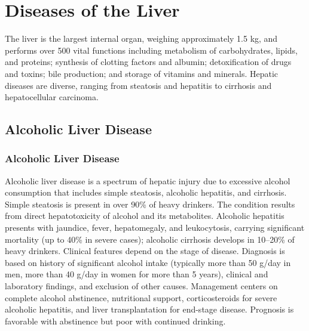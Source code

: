\chapter{Diseases of the Liver}
\label{ch:liver}
The liver is the largest internal organ, weighing approximately 1.5 kg, and performs over 500 vital functions including metabolism of carbohydrates, lipids, and proteins; synthesis of clotting factors and albumin; detoxification of drugs and toxins; bile production; and storage of vitamins and minerals. Hepatic diseases are diverse, ranging from steatosis and hepatitis to cirrhosis and hepatocellular carcinoma.

\section{Alcoholic Liver Disease}








\label{sec:section:Alcoholic Liver Disease}

\subsection{Alcoholic Liver Disease}
\label{sec:Alcoholic Liver Disease}
Alcoholic liver disease is a spectrum of hepatic injury due to excessive alcohol consumption that includes simple steatosis, alcoholic hepatitis, and cirrhosis. Simple steatosis is present in over 90\% of heavy drinkers. The condition results from direct hepatotoxicity of alcohol and its metabolites. Alcoholic hepatitis presents with jaundice, fever, hepatomegaly, and leukocytosis, carrying significant mortality (up to 40\% in severe cases); alcoholic cirrhosis develops in 10--20\% of heavy drinkers. Clinical features depend on the stage of disease. Diagnosis is based on history of significant alcohol intake (typically more than 50 g/day in men, more than 40 g/day in women for more than 5 years), clinical and laboratory findings, and exclusion of other causes. Management centers on complete alcohol abstinence, nutritional support, corticosteroids for severe alcoholic hepatitis, and liver transplantation for end-stage disease. Prognosis is favorable with abstinence but poor with continued drinking.

